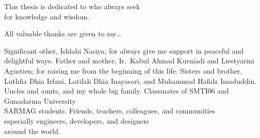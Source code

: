 
\clearpage
\vspace*{\fill}
\begin{minipage}{.8\textwidth}
\begin{center}



\hfill

\noindent This thesis is dedicated to who always seek\\for knowledge and wisdom.

\hfill

\noindent All valuable thanks are given to my\ldots

\begin{itemize}
\idia Significant other, Ishlahi Nasiya; for always give me support in peaceful and delightful ways.
\idia Father and mother, Ir.\ Kabul Ahmad Kurniadi and Liestyarini Agustien; for raising me from the beginning of this life.
\idia Sisters and brother, Luthfia Dhia Irfani, Latifah Dhia Inayasari, and Muhammad Hafidz Imaduddin.
\idia Uncles and aunts, and my whole big family.
\idia Classmates of SMTI06 and Gunadarma University\\SARMAG students.
\idia Friends, teachers, colleagues, and communities\\especially engineers, developers, and designers\\around the world.
\end{itemize}

\end{center}
\end{minipage}
\vfill %
\clearpage
